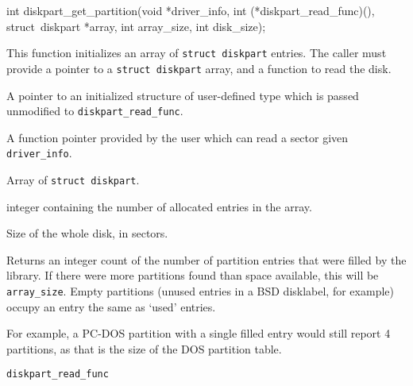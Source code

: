 \begin{apisyn}

        \funcproto int diskpart_get_partition(void *driver_info, 
			int (*diskpart_read_func)(),
                        struct~diskpart *array, int array_size,
                        int disk_size);

\end{apisyn}
\begin{apidesc}
        This function initializes an array of {\tt struct~diskpart} entries.
        The caller must provide a pointer to a {\tt struct~diskpart} array,
	and a function to read the disk.
\end{apidesc}
\begin{apiparm}
        \item[driver_info]
                A pointer to an initialized structure of user-defined type
                which is passed unmodified to {\tt diskpart_read_func}.
	\item[diskpart_read_func]
		A function pointer provided by the user which can read
		a sector given {\tt driver_info}.
	\item[array]
		Array of {\tt struct~diskpart}.
	\item[array_size]
		integer containing the number of allocated entries in
		the array.
	\item[disk_size]
		Size of the whole disk, in sectors.
\end{apiparm}
\begin{apiret}
	Returns an integer count of the number of partition entries that were
	filled by the library.  If there were more partitions found than
	space available, this will be {\tt array_size}.
	Empty partitions (unused entries in a BSD disklabel, for example)
	occupy an entry the same as `used' entries.

	For example, a PC-DOS partition with a single filled entry would still
	report 4 partitions, as that is the size of the DOS partition table.
\end{apiret}
\begin{apirel}
	{\tt diskpart_read_func}
\end{apirel}


